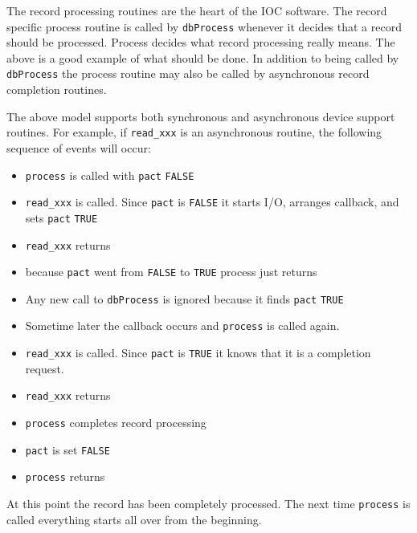 The record processing routines are the heart of the IOC software. The record specific process routine is called by 
\verb|dbProcess| whenever it decides that a record should be processed. Process decides what record processing really means. 
The above is a good example of what should be done. In addition to being called by \verb|dbProcess| the process routine may 
also be called by asynchronous record completion routines.

The above model supports both synchronous and asynchronous device support routines. For example, if \verb|read_xxx| is an 
asynchronous routine, the following sequence of events will occur:

\begin{itemize}
\item \verb|process| is called with \verb|pact| \verb|FALSE|

\item \verb|read_xxx| is called. Since \verb|pact| is \verb|FALSE| it starts I/O, arranges callback, and sets \verb|pact| \verb|TRUE|

\item \verb|read_xxx| returns

\item because \verb|pact| went from \verb|FALSE| to \verb|TRUE| process just returns

\item Any new call to \verb|dbProcess| is ignored because it finds \verb|pact| \verb|TRUE|

\item Sometime later the callback occurs and \verb|process| is called again.

\item \verb|read_xxx| is called. Since \verb|pact| is \verb|TRUE| it knows that it is a completion request.

\item \verb|read_xxx| returns

\item \verb|process| completes record processing

\item \verb|pact| is set \verb|FALSE|

\item \verb|process| returns

\end{itemize}

At this point the record has been completely processed. The next time \verb|process| is called everything starts all over from 
the beginning.

